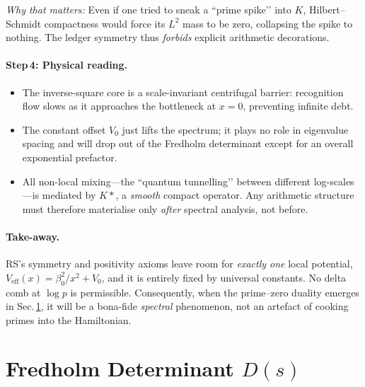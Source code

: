 \documentclass[11pt]{article}
\begin{document}
\emph{Why that matters:}  
Even if one tried to sneak a “prime spike’’ into $K$, 
Hilbert–Schmidt compactness would force its $L^{2}$ mass to be zero,
collapsing the spike to nothing.  The ledger symmetry
thus \emph{forbids} explicit arithmetic decorations.

\vspace{0.4em}
\paragraph{Step\,4: Physical reading.}

\begin{itemize}
\item The inverse-square core is a scale-invariant centrifugal barrier:
      recognition flow slows as it approaches the bottleneck at $x=0$,
      preventing infinite debt.
\item The constant offset $V_{0}$ just lifts the spectrum; it plays no
      role in eigenvalue spacing and will drop out of the Fredholm
      determinant except for an overall exponential prefactor.
\item All non-local mixing---the “quantum tunnelling’’ between different
      log-scales---is mediated by $K\!\ast$, a \emph{smooth} compact
      operator.  
      Any arithmetic structure must therefore materialise only
      \emph{after} spectral analysis, not before.
\end{itemize}

\vspace{0.4em}
\paragraph{Take-away.}  
RS’s symmetry and positivity axioms leave room for \emph{exactly one}
local potential, $V_{\mathrm{eff}}(x)=\beta_{0}^{2}/x^{2}+V_{0}$, and
it is entirely fixed by universal constants.  
No delta comb at $\log p$ is permissible.  
Consequently, when the prime–zero duality emerges in
Sec.\,\ref{sec:FredholmDet}, it will be a bona-fide \emph{spectral}
phenomenon, not an artefact of cooking primes into the Hamiltonian.

\section{Fredholm Determinant \texorpdfstring{$D(s)$}{D(s)}}
\label{sec:FredholmDet}
\end{document}

